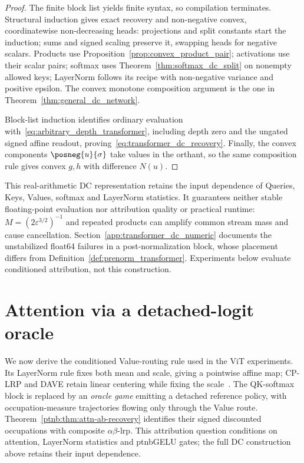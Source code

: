 \begin{proof}
The finite block list yields finite syntax, so compilation terminates. Structural induction gives exact recovery and non-negative convex, coordinatewise non-decreasing heads: projections and split constants start the induction; sums and signed scaling preserve it, swapping heads for negative scalars. Products use Proposition~\ref{prop:convex_product_pair}; activations use their scalar pairs; softmax uses Theorem~\ref{thm:softmax_dc_split} on nonempty allowed keys; LayerNorm follows its recipe with non-negative variance and positive epsilon. The convex monotone composition argument is the one in Theorem~\ref{thm:general_dc_network}.

Block-list induction identifies ordinary evaluation with~\eqref{eq:arbitrary_depth_transformer}, including depth zero and the ungated signed affine readout, proving~\eqref{eq:transformer_dc_recovery}. Finally, the convex components $\posneg{u}{\sigma}$ take values in the orthant, so the same composition rule gives convex $g,h$ with difference $N(u)$.
\end{proof}

This real-arithmetic DC representation retains the input dependence of Queries, Keys, Values, softmax and LayerNorm statistics. It guarantees neither stable floating-point evaluation nor attribution quality or practical runtime: $M=(2\varepsilon^{3/2})^{-1}$ and repeated products can amplify common stream mass and cause cancellation. Section~\ref{app:transformer_dc_numeric} documents the unstabilized float64 failures in a post-normalization block, whose placement differs from Definition~\ref{def:prenorm_transformer}. Experiments below evaluate conditioned attribution, not this construction.

\section{Attention via a detached-logit oracle}\label{ptnb:sec:attention}\label{ptnb:app:vit-extension}\label{sec:attention_routing_game}\label{ptnb:app:attention-subgame}\label{app:supp_attention}

We now derive the conditioned Value-routing rule used in the ViT experiments. Its LayerNorm rule fixes both mean and scale, giving a pointwise affine map; CP-LRP and DAVE retain linear centering while fixing the scale~\parencite{Ali2022AttnLRP,Wrobel2024}. The QK-softmax block is replaced by an \emph{oracle game} emitting a detached reference policy, with occupation-measure trajectories flowing only through the Value route. Theorem~\ref{ptnb:thm:attn-ab-recovery} identifies their signed discounted occupations with composite $\alpha\beta$-\ac{lrp}. This attribution question conditions on attention, LayerNorm statistics and \acs{ptnbGELU} gates; the full DC construction above retains their input dependence.

